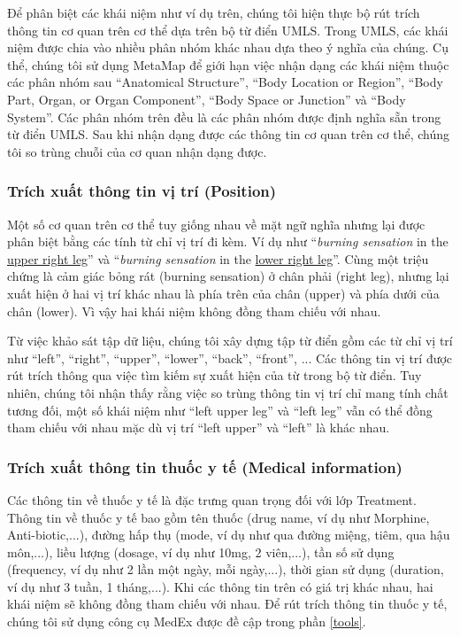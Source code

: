 Để phân biệt các khái niệm như ví dụ trên, chúng tôi hiện thực bộ rút trích thông tin cơ quan trên cơ thể dựa trên bộ từ điển UMLS. Trong UMLS, các khái niệm được chia vào nhiều phân nhóm khác nhau dựa theo ý nghĩa của chúng. Cụ thể, chúng tôi sử dụng MetaMap để giới hạn việc nhận dạng các khái niệm thuộc các phân nhóm sau ``Anatomical Structure'', ``Body Location or Region'', ``Body Part, Organ, or Organ Component'', ``Body Space or Junction'' và ``Body System''. Các phân nhóm trên đều là các phân nhóm được định nghĩa sẵn trong từ điển UMLS. Sau khi nhận dạng được các thông tin cơ quan trên cơ thể, chúng tôi so trùng chuỗi của cơ quan nhận dạng được.

\subsubsection*{Trích xuất thông tin vị trí (Position)}
Một số cơ quan trên cơ thể tuy giống nhau về mặt ngữ nghĩa nhưng lại được phân biệt bằng các tính từ chỉ vị trí đi kèm. Ví dụ như ``\textit{burning sensation} in the \underline{upper right leg}'' và ``\textit{burning sensation} in the \underline{lower right leg}''. Cùng một triệu chứng là cảm giác bỏng rát (burning sensation) ở chân phải (right leg), nhưng lại xuất hiện ở hai vị trí khác nhau là phía trên của chân (upper) và phía dưới của chân (lower). Vì vậy hai khái niệm không đồng tham chiếu với nhau.

Từ việc khảo sát tập dữ liệu, chúng tôi xây dựng tập từ điển gồm các từ chỉ vị trí như ``left'', ``right'', ``upper'', ``lower'', ``back'', ``front'', ... Các thông tin vị trí được rút trích thông qua việc tìm kiếm sự xuất hiện của từ trong bộ từ điển. Tuy nhiên, chúng tôi nhận thấy rằng việc so trùng thông tin vị trí chỉ mang tính chất tương đối, một số khái niệm như ``left upper leg'' và ``left leg'' vẫn có thể đồng tham chiếu với nhau mặc dù vị trí ``left upper'' và ``left'' là khác nhau.

\subsubsection*{Trích xuất thông tin thuốc y tế (Medical information)}
Các thông tin về thuốc y tế là đặc trưng quan trọng đối với lớp Treatment. Thông tin về thuốc y tế bao gồm tên thuốc (drug name, ví dụ như Morphine, Anti-biotic,...), đường hấp thụ (mode, ví dụ như qua đường miệng, tiêm, qua hậu môn,...), liều lượng (dosage, ví dụ như 10mg, 2 viên,...), tần số sử dụng (frequency, ví dụ như 2 lần một ngày, mỗi ngày,...), thời gian sử dụng (duration, ví dụ như 3 tuần, 1 tháng,...). Khi các thông tin trên có giá trị khác nhau, hai khái niệm sẽ không đồng tham chiếu với nhau. Để rút trích thông tin thuốc y tế, chúng tôi sử dụng công cụ MedEx được đề cập trong phần \ref{tools}.

